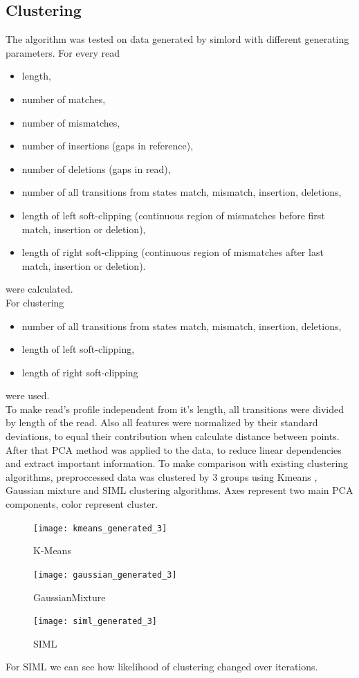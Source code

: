 \documentclass[a4paper, 12pt]{article}
\theoremstyle{definition}
\theoremstyle{definition}
\theoremstyle{remark}
\begin{document}
\subsection{Clustering}
The algorithm was tested on data generated by simlord \cite{stocker2016simlord} 
with different generating parameters. For every read 
\begin{itemize}
    \item length,
    \item number of matches,
    \item number of mismatches,
    \item number of insertions (gaps in reference),
    \item number of deletions (gaps in read),
    \item number of all transitions from states match, mismatch, insertion, deletions,
    \item length of left soft-clipping (continuous region of mismatches before first match, insertion or deletion),
    \item length of right soft-clipping (continuous region of mismatches after last match, insertion or deletion). 
\end{itemize}
were calculated. \\
For clustering 
\begin{itemize}
    \item number of all transitions from states match, mismatch, insertion, deletions,
    \item length of left soft-clipping,
    \item length of right soft-clipping      
\end{itemize}
were used. \\
To make read's profile independent from it's length, 
all transitions were divided by length of the read.
Also all features were normalized by their standard deviations, 
to equal their contribution when calculate distance between points.
After that PCA method \cite{abdi2010principal} was applied to the data, 
to reduce linear dependencies and extract important information.
To make comparison with existing clustering algorithms,
preproccessed data was clustered by 3 groups using  
Kmeans \cite{sklearn_api}, Gaussian mixture \cite{sklearn_api} and SIML clustering algorithms.
Axes represent two main PCA components, color represent cluster.
\begin{figure}[H]
      \texttt{[image: kmeans\_generated\_3]}
      \caption{K-Means}
    \endminipage\hfill
      \texttt{[image: gaussian\_generated\_3]}
      \caption{GaussianMixture}
    \endminipage\hfill
    \texttt{[image: siml\_generated\_3]}
    \caption{SIML}
    \endminipage
\end{figure}
For SIML we can see how likelihood of clustering changed over iterations.
\end{document}
